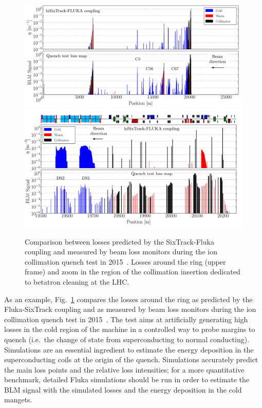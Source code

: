 \documentclass{ws-ijmpa}
\begin{document}
\begin{figure}[!tbh]
\centering
 \includegraphics[width=\textwidth]{QT_LHC_mod.png}
 \includegraphics[width=\textwidth]{QT_IR7_mod.png}
 \caption{Comparison between losses predicted by the SixTrack-Fluka coupling and measured by beam loss monitors during the ion collimation quench test in 2015~\cite{PDHermes-PhD}. Losses around the ring (upper frame) and zoom in the region of the collimation insertion dedicated to betatron cleaning at the LHC.}
 \label{fig:QT_LMs}
\end{figure}
As an example, Fig.~\ref{fig:QT_LMs} compares the losses around the ring as predicted by the Fluka-SixTrack coupling and as measured by beam loss monitors during the ion collimation quench test in 2015~\cite{PDHermes-PhD}. The test aims at artificially generating high losses in the cold region of the machine in a controlled way to probe margins to quench (i.e.~the change of state from superconducting to normal conducting). Simulations are an essential ingredient to estimate the energy deposition in the superconducting coils at the origin of the quench. Simulations accurately predict the main loss points and the relative loss intensities; for a more quantitative benchmark, detailed Fluka simulations should be run in order to estimate the BLM signal with the simulated losses and the energy deposition in the cold mangets.
\end{document}
